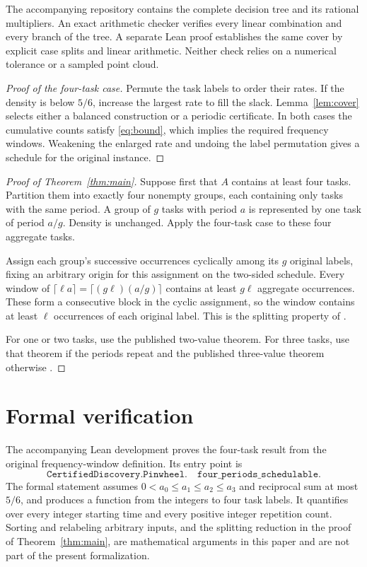 \documentclass[11pt]{article}
\begin{document}
The accompanying repository contains the complete decision tree and its rational multipliers. An exact arithmetic checker verifies every linear combination and every branch of the tree. A separate Lean proof establishes the same cover by explicit case splits and linear arithmetic. Neither check relies on a numerical tolerance or a sampled point cloud.

\begin{proof}[Proof of the four-task case]
Permute the task labels to order their rates. If the density is below $5/6$, increase the largest rate to fill the slack. Lemma~\ref{lem:cover} selects either a balanced construction or a periodic certificate. In both cases the cumulative counts satisfy \eqref{eq:bound}, which implies the required frequency windows. Weakening the enlarged rate and undoing the label permutation gives a schedule for the original instance.
\end{proof}

\begin{proof}[Proof of Theorem~\ref{thm:main}]
Suppose first that $A$ contains at least four tasks. Partition them into exactly four nonempty groups, each containing only tasks with the same period. A group of $g$ tasks with period $a$ is represented by one task of period $a/g$. Density is unchanged. Apply the four-task case to these four aggregate tasks.

Assign each group's successive occurrences cyclically among its $g$ original labels, fixing an arbitrary origin for this assignment on the two-sided schedule. Every window of $\lceil\ell a\rceil=\lceil(g\ell)(a/g)\rceil$ contains at least $g\ell$ aggregate occurrences. These form a consecutive block in the cyclic assignment, so the window contains at least $\ell$ occurrences of each original label. This is the splitting property of \cite{kawamura}.

For one or two tasks, use the published two-value theorem. For three tasks, use that theorem if the periods repeat and the published three-value theorem otherwise \cite{fmo}.
\end{proof}

\section{Formal verification}\label{sec:verification}
The accompanying Lean development proves the four-task result from the original frequency-window definition. Its entry point is
\[
\texttt{CertifiedDiscovery.Pinwheel.}\quad
\texttt{four\_periods\_schedulable}.
\]
The formal statement assumes $0<a_0\leq a_1\leq a_2\leq a_3$ and reciprocal sum at most $5/6$, and produces a function from the integers to four task labels. It quantifies over every integer starting time and every positive integer repetition count. Sorting and relabeling arbitrary inputs, and the splitting reduction in the proof of Theorem~\ref{thm:main}, are mathematical arguments in this paper and are not part of the present formalization.
\end{document}

